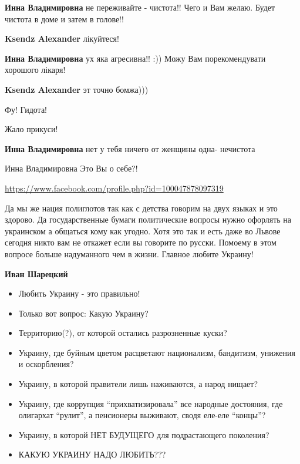 \begin{itemize}
{\begin{itemize}
\textbf{Инна Владимировна} не переживайте - чистота!! Чего и Вам желаю. Будет чистота в доме и затем в голове!!

\textbf{Ksendz Alexander} лікуйтеся!

\textbf{Инна Владимировна} ух яка агресивна!! :)) Можу Вам порекомендувати хорошого лікаря!

\textbf{Ksendz Alexander} эт точно бомжа)))

Фу! Гидота!

Жало прикуси!

\textbf{Инна Владимировна} нет у тебя ничего от женщины одна- нечистота

Инна Владимировна Это Вы о себе?!
\end{itemize}

\url{https://www.facebook.com/profile.php?id=100047878097319}

Да мы же нация полиглотов так как с детства говорим на двух языках и это
здорово. Да государственные бумаги политические вопросы нужно офорлять на
украинском а общаться кому как угодно. Хотя это так и есть даже во Львове
сегодня никто вам не откажет если вы говорите по русски. Помоему в этом вопросе
больше надуманного чем в жизни. Главное любите Украину!

\begin{itemize}

\textbf{Иван Шарецкий}

\begin{itemize}
  \item Любить Украину - это правильно!
  \item Только вот вопрос: Какую Украину?
  \item Территорию(?), от которой остались разрозненные куски?
  \item Украину, где буйным цветом расцветают национализм, бандитизм, унижения и оскорбления?
  \item Украину, в которой правители лишь наживаются, а народ нищает?
  \item Украину, где коррупция \enquote{прихватизировала} все народные достояния, где
  олигархат \enquote{рулит}, а пенсионеры выживают, сводя еле-еле \enquote{концы}?
  \item Украину, в которой НЕТ БУДУЩЕГО для подрастающего поколения?
  \item КАКУЮ УКРАИНУ НАДО ЛЮБИТЬ???
\end{itemize}


\end{itemize}}
\end{itemize}
